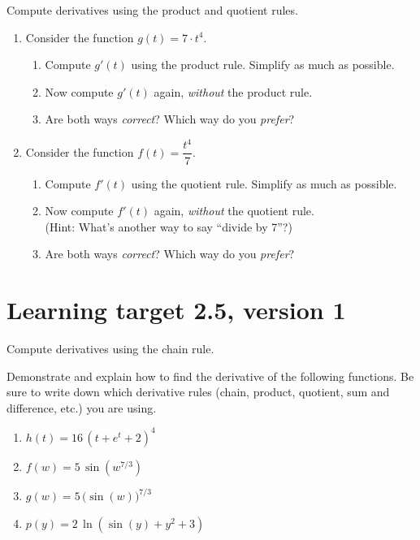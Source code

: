 Compute derivatives using the product and quotient rules.

\hrulefill

\begin{enumerate}[leftmargin=15pt]
    \item Consider the function $g(t) = 7\cdot t^4$.
    \begin{enumerate}
        \item Compute $g'(t)$ using the product rule. Simplify as much as possible.
        \vfill
        \item Now compute $g'(t)$ again, \textit{without} the product rule.
        \vfill
        \item Are both ways \textit{correct}? Which way do you \textit{prefer}?
        \vfill
    \end{enumerate}
    \item Consider the function $f(t) = \dfrac{t^4}{7}$. 

    \begin{enumerate}
        \item Compute $f'(t)$ using the quotient rule. Simplify as much as possible.
        \vfill
        \item Now compute $f'(t)$ again, \textit{without} the quotient rule.\\
        (Hint: What's another way to say ``divide by 7''?)
        \vfill
        \item Are both ways \textit{correct}? Which way do you \textit{prefer}?
    \end{enumerate}
\end{enumerate}

\pagebreak

\section{Learning target 2.5, version 1}

Compute derivatives using the chain rule.

\hrulefill

Demonstrate and explain how to find the derivative of the following functions. Be sure to write down which derivative rules (chain, product, quotient, sum and difference, etc.) you are using.

\begin{enumerate}
    \item \(h(t)= 16 \, {\left(t + e^{t} + 2\right)}^{4}\)
    \vfill
    \item \(f(w)= 5 \, \sin\left(w^{7/3}\right)\)
    \vfill
    \item \(g(w)= 5 \, \Big(\sin\left(w\right)\Big)^{7/3}\)
    \vfill
    \item \(p(y) = 2\, \ln\left(\sin(y) + y^2 + 3\right)\)
    \vfill
\end{enumerate}

